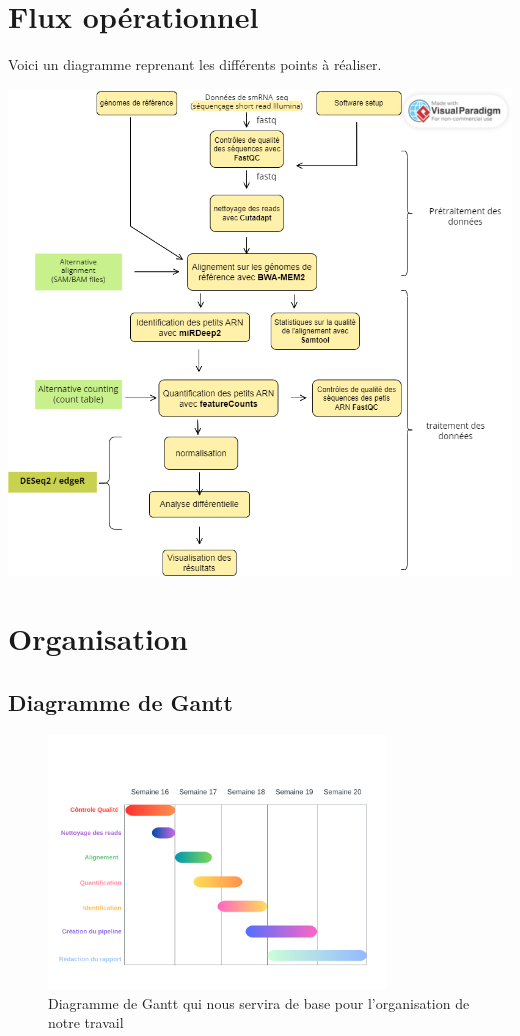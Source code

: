 \documentclass{report}
\begin{document}
\chapter{Flux opérationnel}
Voici un diagramme reprenant les différents points à réaliser.
\begin{center}
    \includegraphics[scale=0.6]{Images/PIPLINE_RNA.png}\\[1cm]
\end{center}

\chapter{Organisation}
\section{Diagramme de Gantt}
\begin{figure}[h]
    \centering
    \includegraphics[width=0.8\textwidth]{Images/controle_qual.png}
    \caption{Diagramme de Gantt qui nous servira de base pour l'organisation de notre travail}
    \label{fig:enter-label}
\end{figure}


\end{document}
